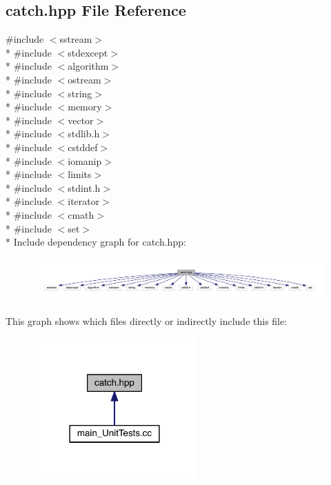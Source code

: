 \hypertarget{a00094}{}\subsection{catch.\+hpp File Reference}
\label{a00094}
{\ttfamily \#include $<$sstream$>$}\\*
{\ttfamily \#include $<$stdexcept$>$}\\*
{\ttfamily \#include $<$algorithm$>$}\\*
{\ttfamily \#include $<$ostream$>$}\\*
{\ttfamily \#include $<$string$>$}\\*
{\ttfamily \#include $<$memory$>$}\\*
{\ttfamily \#include $<$vector$>$}\\*
{\ttfamily \#include $<$stdlib.\+h$>$}\\*
{\ttfamily \#include $<$cstddef$>$}\\*
{\ttfamily \#include $<$iomanip$>$}\\*
{\ttfamily \#include $<$limits$>$}\\*
{\ttfamily \#include $<$stdint.\+h$>$}\\*
{\ttfamily \#include $<$iterator$>$}\\*
{\ttfamily \#include $<$cmath$>$}\\*
{\ttfamily \#include $<$set$>$}\\*
Include dependency graph for catch.\+hpp\+:\nopagebreak
\begin{figure}[H]
\begin{center}
\leavevmode
\includegraphics[width=350pt]{a00129}
\end{center}
\end{figure}
This graph shows which files directly or indirectly include this file\+:\nopagebreak
\begin{figure}[H]
\begin{center}
\leavevmode
\includegraphics[width=177pt]{a00130}
\end{center}
\end{figure}
